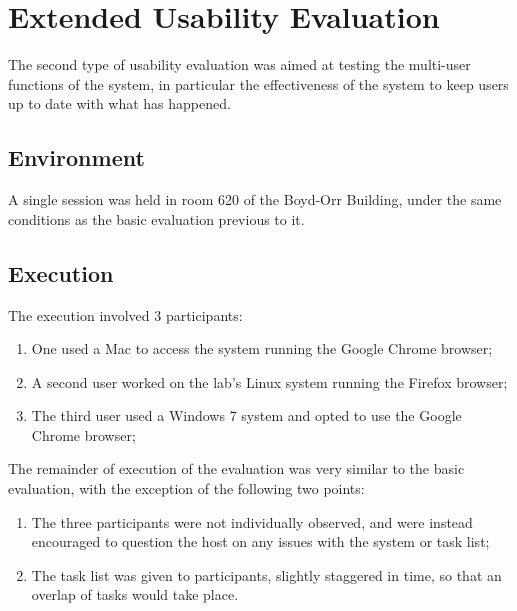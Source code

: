 \section{Extended Usability Evaluation}
The second type of usability evaluation was aimed at testing the multi-user functions of the system, in particular the effectiveness of the system to keep users up to date with what has happened. 

\subsection{Environment}
A single session was held in room 620 of the Boyd-Orr Building, under the same conditions as the basic evaluation previous to it.

\subsection{Execution}
The execution involved 3 participants:
\begin{enumerate}
	\item One used a Mac to access the system running the Google Chrome browser;
	\item A second user worked on the lab's Linux system running the Firefox browser;
	\item The third user used a Windows 7 system and opted to use the Google Chrome browser;
\end{enumerate}

The remainder of execution of the evaluation was very similar to the basic evaluation, with the exception of the following two points:
\begin{enumerate}
	\item The three participants were not individually observed, and were instead encouraged to question the host on any issues with the system or task list;
	\item The task list was given to participants, slightly staggered in time, so that an overlap of tasks would take place.
\end{enumerate}

